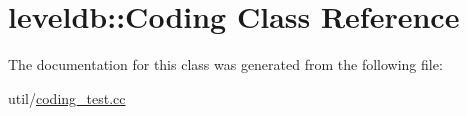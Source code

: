 \hypertarget{classleveldb_1_1_coding}{\section{leveldb\-:\-:Coding Class Reference}
\label{classleveldb_1_1_coding}
}


The documentation for this class was generated from the following file\-:\begin{DoxyCompactItemize}
\item 
util/\hyperlink{coding__test_8cc}{coding\-\_\-test.\-cc}\end{DoxyCompactItemize}
